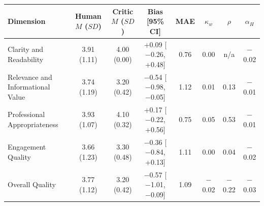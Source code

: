 \begin{tabular}{lccccccc}
\toprule
Dimension & Human $M$ ($SD$) & Critic $M$ ($SD$) & Bias [95\% CI] & MAE & $\kappa_w$ & $\rho$ & $\alpha_H$ \\
\midrule
Clarity and Readability & 3.91 (1.11) & 4.00 (0.00) & +0.09 [$-$0.26, +0.48] & 0.76 & 0.00 & n/a & $-$0.02 \\
Relevance and Informational Value & 3.74 (1.19) & 3.20 (0.42) & $-$0.54 [$-$0.98, $-$0.05] & 1.12 & 0.01 & 0.13 & $-$0.01 \\
Professional Appropriateness & 3.93 (1.07) & 4.10 (0.32) & +0.17 [$-$0.22, +0.56] & 0.75 & 0.05 & 0.53 & $-$0.01 \\
Engagement Quality & 3.66 (1.23) & 3.30 (0.48) & $-$0.36 [$-$0.84, +0.13] & 1.11 & 0.00 & 0.04 & $-$0.02 \\
\midrule
Overall Quality & 3.77 (1.12) & 3.20 (0.42) & $-$0.57 [$-$1.01, $-$0.09] & 1.09 & $-$0.02 & $-$0.22 & $-$0.03 \\
\bottomrule
\end{tabular}
